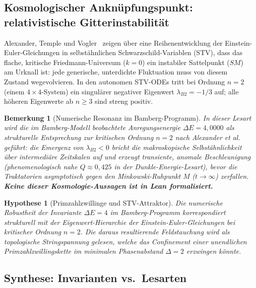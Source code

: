 \documentclass[11pt,a4paper]{article}
\newtheorem{remark}{Bemerkung}
\newtheorem{hypothesis}{Hypothese}
\begin{document}
	\subsection{Kosmologischer Anknüpfungspunkt: relativistische Gitterinstabilität}
	\label{sec:bridge-cosmology}
	
	Alexander, Temple und Vogler~\cite{alexander-temple-vogler-2026} zeigen über
	eine Reihenentwicklung der Einstein-Euler-Gleichungen in selbstähnlichen
	Schwarzschild-Variablen (STV), dass das flache, kritische Friedmann-Universum
	($k=0$) ein instabiler Sattelpunkt ($SM$) am Urknall ist:
	jede generische, unterdichte Fluktuation muss von diesem Zustand wegevolvieren.
	In den autonomen STV-ODEs tritt bei Ordnung $n=2$ (einem $4\times4$-System)
	ein singulärer negativer Eigenwert $\lambda_{B2}=-1/3$ auf;
	alle höheren Eigenwerte ab $n\ge 3$ sind streng positiv.
	
	\begin{remark}[Numerische Resonanz im Bamberg-Programm]
		In dieser Lesart wird die im Bamberg-Modell beobachtete Anregungsenergie
		$\Delta E=4{,}0000$ als \emph{strukturelle} Entsprechung zur kritischen
		Ordnung $n=2$ nach Alexander et al.~\cite{alexander-temple-vogler-2026}
		geführt: die Emergenz von $\lambda_{B2}<0$ bricht die makroskopische
		Selbstähnlichkeit über intermediäre Zeitskalen auf und erzeugt transiente,
		anomale Beschleunigung (phenomenologisch nahe $Q\approx 0{,}425$ in der
		Dunkle-Energie-Lesart), bevor die Traktatorien asymptotisch gegen den
		Minkowski-Ruhpunkt $M$ ($t\to\infty$) zerfallen.
		\textbf{Keine dieser Kosmologie-Aussagen ist in Lean formalisiert.}
	\end{remark}
	
	\begin{hypothesis}[Primzahlzwillinge und STV-Attraktor]
		\label{hyp:prime-twin-stv}
		Die numerische Robustheit der Invariante $\Delta E=4$ im Bamberg-Programm
		korrespondiert strukturell mit der Eigenwert-Hierarchie der Einstein-Euler-Gleichungen
		bei kritischer Ordnung $n=2$.
		Die daraus resultierende Feldstauchung wird als topologische Stringspannung
		gelesen, welche das Confinement einer unendlichen Primzahlzwillingskette im
		minimalen Phasenabstand $\Delta=2$ \emph{erzwingen könnte}.
	\end{hypothesis}
	
	\subsection{Synthese: Invarianten vs.\ Lesarten}
	
\end{document}
